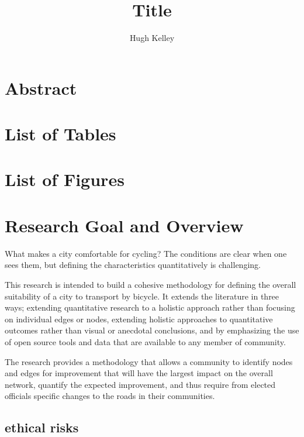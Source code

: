 \documentclass[11pt]{article} %
\title{\vspace{-3.0cm}Title}
\author{Hugh Kelley}
\begin{document}
\maketitle








\section{Abstract}

\section{List of Tables}

\section{List of Figures}


\section{Research Goal and Overview}
What makes a city comfortable for cycling? The conditions are clear when one sees them, but defining the characteristics quantitatively is challenging. 

This research is intended to build a cohesive methodology for defining the overall suitability of a city to transport by bicycle. It extends the literature in three ways; extending quantitative research to a holistic approach rather than focusing on individual edges or nodes, extending holistic approaches to quantitative outcomes rather than visual or anecdotal conclusions, and by emphasizing the use of open source tools and data that are available to any member of community. 

The research provides a methodology that allows a community to identify nodes and edges for improvement that will have the largest impact on the overall network, quantify the expected improvement, and thus require from elected officials specific changes to the roads in their communities. 

\subsection{ethical risks}
\end{document}
